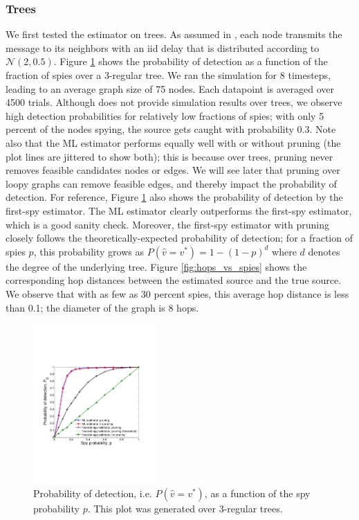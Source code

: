 \subsubsection{Trees}
We first tested the estimator on trees. As assumed in \cite{pinto}, each node transmits the message to its neighbors with an iid delay that is distributed according to $\mathcal N(2,0.5)$. Figure \ref{fig:pd_vs_spies} shows the probability of detection as a function of the fraction of spies over a 3-regular tree. We ran the simulation for 8 timesteps, leading to an average graph size of 75 nodes. Each datapoint is averaged over 4500 trials. Although \cite{pinto} does not provide simulation results over trees, we observe high detection probabilities for relatively low fractions of spies; with only 5 percent of the nodes spying, the source gets caught with probability 0.3. Note also that the ML estimator performs equally well with or without pruning (the plot lines are jittered to show both); this is because over trees, pruning never removes feasible candidates nodes or edges. We will see later that pruning over loopy graphs can remove feasible edges, and thereby impact the probability of detection. 
For reference, Figure \ref{fig:pd_vs_spies} also shows the probability of detection by the first-spy estimator. The ML estimator clearly outperforms the first-spy estimator, which is a good sanity check. Moreover, the first-spy estimator with pruning closely follows the theoretically-expected probability of detection; for a fraction of spies $p$, this probability grows as $P(\hat v=v^*)=1-(1-p)^d$ where $d$ denotes the degree of the underlying tree.
Figure \ref{fig:hops_vs_spies} shows the corresponding hop distances between the estimated source and the true source. We observe that with as few as 30 percent spies, this average hop distance is less than 0.1; the diameter of the graph is 8 hops. 
\begin{figure}
\centering
\includegraphics[height = 2.4in]{figures/pd_vs_spies}
\caption{Probability of detection, i.e. $P(\hat v = v^*)$, as a function of the spy probability $p$. This plot was generated over 3-regular trees. %
}
\label{fig:pd_vs_spies}
\end{figure}

